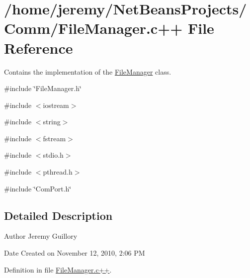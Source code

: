 \hypertarget{_file_manager_8c_09_09}{
\section{/home/jeremy/NetBeansProjects/Comm/FileManager.c++ File Reference}
\label{_file_manager_8c_09_09}
}


Contains the implementation of the \hyperlink{class_file_manager}{FileManager} class.  


{\ttfamily \#include \char`\"{}FileManager.h\char`\"{}}\par
{\ttfamily \#include $<$iostream$>$}\par
{\ttfamily \#include $<$string$>$}\par
{\ttfamily \#include $<$fstream$>$}\par
{\ttfamily \#include $<$stdio.h$>$}\par
{\ttfamily \#include $<$pthread.h$>$}\par
{\ttfamily \#include \char`\"{}ComPort.h\char`\"{}}\par


\subsection{Detailed Description}
\begin{DoxyAuthor}{Author}
Jeremy Guillory 
\end{DoxyAuthor}
\begin{DoxyDate}{Date}
Created on November 12, 2010, 2:06 PM 
\end{DoxyDate}


Definition in file \hyperlink{_file_manager_8c_09_09_source}{FileManager.c++}.

